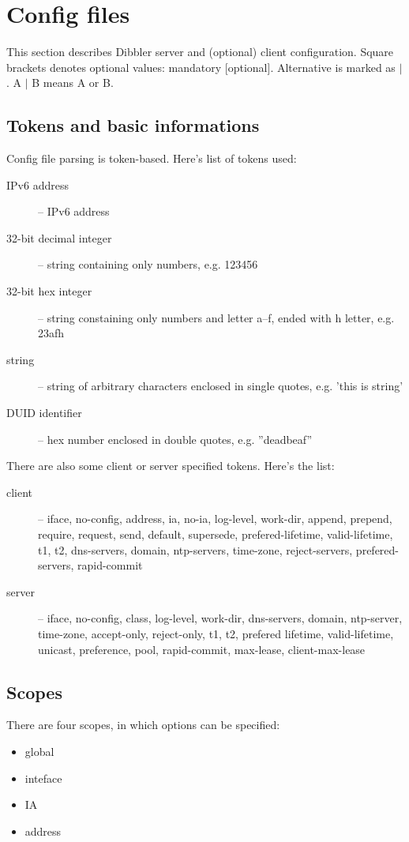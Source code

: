 
\section{Config files}

This section describes Dibbler server and (optional) client
configuration. Square brackets denotes optional values: mandatory
[optional]. Alternative is marked as $\mid$. A $\mid$ B means A or B.

\subsection{Tokens and basic informations}
Config file parsing is token-based. Here's list of tokens used:
\begin{description}
\item[IPv6 address] -- IPv6 address 
\item[32-bit decimal integer] -- string containing only numbers, e.g. 123456
\item[32-bit hex integer] -- string constaining only numbers and
  letter a--f, ended with h letter, e.g. 23afh
\item[string] -- string of arbitrary characters enclosed in single
  quotes, e.g. 'this is string'
\item[DUID identifier] -- hex number enclosed in double quotes, e.g. ''deadbeaf''
\end{description}

There are also some client or server specified tokens. Here's the list:
\begin{description}
\item[client] -- iface, no-config, address, ia, no-ia,
log-level, work-dir, append, prepend, require, request, send, default,
supersede, prefered-lifetime, valid-lifetime, t1, t2, dns-servers,
domain, ntp-servers, time-zone, reject-servers, prefered-servers,
rapid-commit 
\item[server] -- iface, no-config, class, log-level, work-dir,
  dns-servers, domain, ntp-server, time-zone, accept-only,
  reject-only, t1, t2, prefered lifetime, valid-lifetime, unicast,
  preference, pool, rapid-commit, max-lease, client-max-lease 
\end{description}

\subsection{Scopes}
There are four scopes, in which options can be specified:
\begin{itemize}
\item global
\item inteface
\item IA
\item address
\end{itemize}


